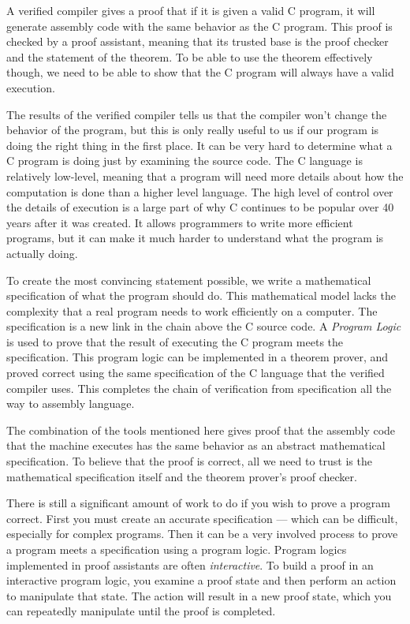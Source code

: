 \documentclass{puthesis}
\begin{document}
A verified compiler gives a proof that if it is given a valid C
program, it will generate assembly code with the same behavior as the
C program. This proof is checked by a proof assistant, meaning that
its trusted base is the proof checker and the statement of the
theorem. To be able to use the theorem effectively though, we need to
be able to show that the C program will always have a valid execution.

The results of the verified compiler tells us that the compiler won't
change the behavior of the program, but this is only really useful to
us if our program is doing the right thing in the first place. It can
be very hard to determine what a C program is doing just by examining
the source code. The C language is relatively
low-level, meaning that a program will need more details about how the
computation is done than a higher level language. The high level of
control over the details of execution is a large part of why C
continues to be popular over 40 years after it was created. It allows
programmers to write more efficient programs, but it can make it much
harder to understand what the program is actually doing.

To create the most convincing statement possible, we write a
mathematical specification of what the program should do. This
mathematical model lacks the complexity that a real program needs to
work efficiently on a computer.  The specification is a new link in
the chain above the C source code. A \emph{Program Logic} is used to
prove that the result of executing the C program meets the
specification. This program logic can be implemented in a theorem
prover, and proved correct using the same specification of the C
language that the verified compiler uses. This completes the chain of
verification from specification all the way to assembly language. 

The combination of the tools mentioned here gives proof that the
assembly code that the machine executes has the same behavior as an
abstract mathematical specification. To believe that the proof is
correct, all we need to trust is the mathematical specification itself
and the theorem prover's proof checker.

There is still a significant amount of work to do if you wish to prove
a program correct. First you must create an accurate specification ---
which can be difficult, especially for complex programs. Then it can
be a very involved process to prove a program meets a specification
using a program logic. Program logics implemented in proof assistants
are often \emph{interactive}. To build a proof in an interactive
program logic, you examine a proof state and then perform an action to
manipulate that state. The action will result in a new proof state,
which you can repeatedly manipulate until the proof is completed.
\end{document}
